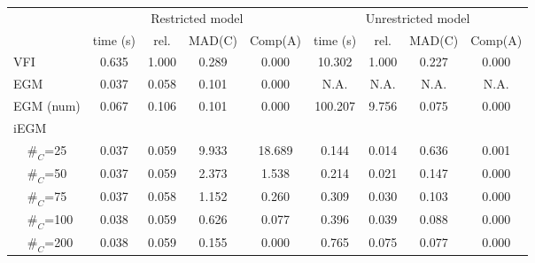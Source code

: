 \begin{tabular}{llcccccccc} \toprule
&& \multicolumn{4}{c}{Restricted model} & \multicolumn{4}{c}{Unrestricted model} \\ 
 \cmidrule(lr){3-6} \cmidrule(lr){7-10} && time (s) & rel. & MAD(C)  & Comp(A) & time (s) & rel. & MAD(C)  & Comp(A) \\ \midrule 
\multicolumn{2}{l}{VFI} & 0.635 & 1.000 & 0.289 & 0.000 & 10.302 & 1.000 & 0.227 & 0.000 \\ 
\multicolumn{2}{l}{EGM} & 0.037 & 0.058 & 0.101 & 0.000 & N.A. & N.A. & N.A. & N.A. \\ 
\multicolumn{2}{l}{EGM (num)} & 0.067 & 0.106 & 0.101 & 0.000 & 100.207 & 9.756 & 0.075 & 0.000 \\ 
\multicolumn{2}{l}{iEGM} & \multicolumn{8}{c}{} \\ 
& $\#_C$=25& 0.037 & 0.059 & 9.933 & 18.689 & 0.144 & 0.014 & 0.636 & 0.001 \\ 
& $\#_C$=50& 0.037 & 0.059 & 2.373 & 1.538 & 0.214 & 0.021 & 0.147 & 0.000 \\ 
& $\#_C$=75& 0.037 & 0.058 & 1.152 & 0.260 & 0.309 & 0.030 & 0.103 & 0.000 \\ 
& $\#_C$=100& 0.038 & 0.059 & 0.626 & 0.077 & 0.396 & 0.039 & 0.088 & 0.000 \\ 
& $\#_C$=200& 0.038 & 0.059 & 0.155 & 0.000 & 0.765 & 0.075 & 0.077 & 0.000 \\ 
\bottomrule \end{tabular}

